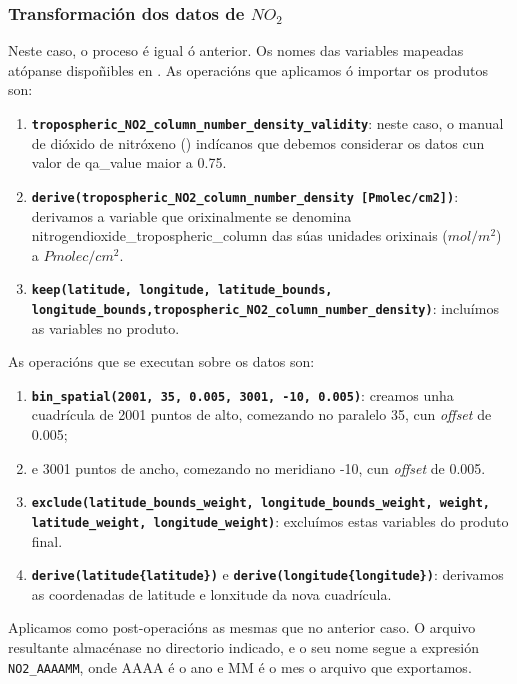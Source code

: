 \subsubsection{Transformación dos datos de $NO_2$}
Neste caso, o proceso é igual ó anterior. Os nomes das variables mapeadas atópanse dispoñibles en \cite{HARPNO2}. As operacións que aplicamos ó importar os produtos son:
\begin{enumerate}
    \item \texttt{\textbf{tropospheric\_NO2\_column\_number\_density\_validity}}: neste caso, o manual de dióxido de nitróxeno (\cite{NO2manual}) indícanos que debemos considerar os datos cun 
    valor de qa\_value maior a 0.75.
    \item \texttt{\textbf{derive(tropospheric\_NO2\_column\_number\_density [Pmolec/cm2])}}: derivamos a variable que orixinalmente se denomina nitrogendioxide\_tropospheric\_\break column das súas
    unidades orixinais ($mol/m^2$) a $Pmolec/cm^2$.
    \item \texttt{\textbf{keep(latitude, longitude, latitude\_bounds, longitude\_bounds,\break tropospheric\_NO2\_column\_number\_density)}}: incluímos as variables no produto.
\end{enumerate}

As operacións que se executan sobre os datos son:
\begin{enumerate}
    \item \texttt{\textbf{bin\_spatial(2001, 35, 0.005, 3001, -10, 0.005)}}: creamos unha cuadrícula de 2001 puntos de alto, comezando no paralelo 35\textdegree, cun \textit{offset} de 0.005\textdegree;
    \item e 3001 puntos de ancho, comezando no meridiano -10\textdegree, cun \textit{offset} de 0.005.
    \item \texttt{\textbf{exclude(latitude\_bounds\_weight, longitude\_bounds\_weight, weight, latitude\_weight, longitude\_weight)}}: excluímos estas variables do produto final.
    \item \texttt{\textbf{derive(latitude\{latitude\})}} e  \texttt{\textbf{derive(longitude\{longitude\})}}: derivamos as coordenadas de latitude e lonxitude da nova cuadrícula.
\end{enumerate}

Aplicamos como post-operacións as mesmas que no anterior caso. O arquivo resultante almacénase no directorio indicado, e o seu nome segue a expresión \texttt{NO2\_AAAAMM}, onde AAAA é o ano e MM é o
mes o arquivo que exportamos.

